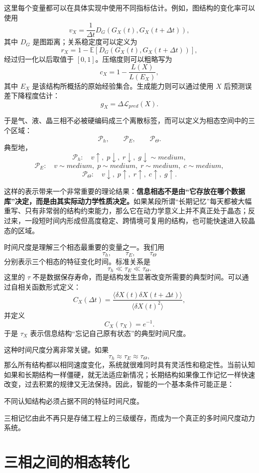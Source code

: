 这里每个变量都可以在具体实现中使用不同指标估计。例如，图结构的变化率可以使用
\[
v_X
=
\frac{1}{\Delta t}
D_G
\left(
G_X(t),
G_X(t+\Delta t)
\right),
\]
其中 $D_G$ 是图距离；关系稳定度可以定义为
\[
r_X
=
1-
\mathbb E
\left[
D_G
\left(
G_X(t),
G_X(t+\Delta t)
\right)
\right],
\]
经过归一化以后取值于 $[0,1]$。压缩度则可以粗略写为
\[
c_X
=
1-
\frac{L(X)}
{L(E_X)},
\]
其中 $E_X$ 是该结构所概括的原始经验集合。生成能力则可以通过使用 $X$ 后预测误差下降程度估计：
\[
g_X
=
\Delta \mathcal L_{pred}(X).
\]

于是气、液、晶三相不必被硬编码成三个离散标签，而可以定义为相态空间中的三个区域：
\[
\mathcal P_h,\qquad
\mathcal P_E,\qquad
\mathcal P_\Theta.
\]
典型地，
\[
\mathcal P_h:
\quad
v\uparrow,\;
p\downarrow,\;
r\downarrow,\;
g\downarrow\sim medium,
\]
\[
\mathcal P_E:
\quad
v\sim medium,\;
p\sim medium,\;
r\sim medium,\;
c\sim medium,
\]
\[
\mathcal P_\Theta:
\quad
v\downarrow,\;
p\uparrow,\;
r\uparrow,\;
c\uparrow,\;
g\uparrow.
\]

这样的表示带来一个非常重要的理论结果：\textbf{信息相态不是由“它存放在哪个数据库”决定，而是由其实际动力学性质决定。}如果某段所谓“长期记忆”每天都被大幅重写、只有非常弱的结构约束能力，那么它在动力学意义上并不真正处于晶态；反过来，一段短时间内形成但高度稳定、跨情境可复用的结构，也可能快速进入较晶态的区域。

时间尺度是理解三个相态最重要的变量之一。我们用
\[
\tau_h,\qquad
\tau_E,\qquad
\tau_\Theta
\]
分别表示三个相态的特征变化时间。标准关系是
\[
\boxed{
\tau_h\ll\tau_E\ll\tau_\Theta.
}
\]
这里的 $\tau$ 不是数据保存寿命，而是结构发生显著改变所需要的典型时间。可以通过自相关函数形式定义：
\[
C_X(\Delta t)
=
\frac{
\langle
\delta X(t)\delta X(t+\Delta t)
\rangle
}{
\langle
\delta X(t)^2
\rangle
},
\]
并定义
\[
C_X(\tau_X)=e^{-1}.
\]
于是 $\tau_X$ 表示信息结构“忘记自己原有状态”的典型时间尺度。

这种时间尺度分离非常关键。如果
\[
\tau_h
\approx
\tau_E
\approx
\tau_\Theta,
\]
那么所有结构都以相同速度变化，系统就很难同时具有灵活性和稳定性。当前认知如果和长期结构一样僵硬，就无法适应新情况；长期结构如果像工作记忆一样快速改变，过去积累的规律又无法保持。因此，智能的一个基本条件可能正是：
\begin{proposition*}
不同认知结构必须占据不同的特征时间尺度。
\end{proposition*}
三相记忆由此不再只是存储工程上的三级缓存，而成为一个真正的多时间尺度动力系统。


\section{三相之间的相态转化}

